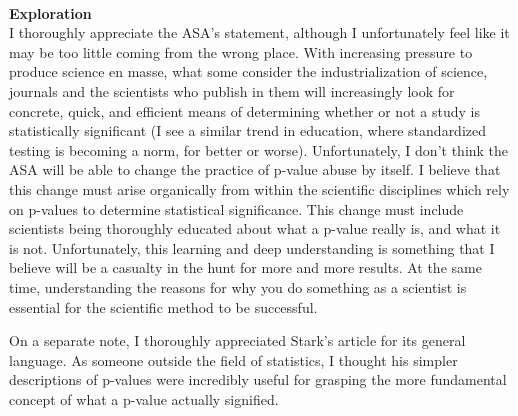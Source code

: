 \documentclass{report}
\newcommand{\tab}{\-\hspace{1cm}}
\begin{document}
\-\\
\textbf{Exploration}\\
\tab I thoroughly appreciate the ASA's statement, although I unfortunately feel like it may be too little coming from the wrong place. With increasing pressure to produce science en masse, what some consider the industrialization of science, journals and the scientists who publish in them will increasingly look for concrete, quick, and efficient means of determining whether or not a study is statistically significant (I see a similar trend in education, where standardized testing is becoming a norm, for better or worse). Unfortunately, I don't think the ASA will be able to change the practice of p-value abuse by itself. I believe that this change must arise organically from within the scientific disciplines which rely on p-values to determine statistical significance. This change must include scientists being thoroughly educated about what a p-value really is, and what it is not. Unfortunately, this learning and deep understanding is something that I believe will be a casualty in the hunt for more and more results. At the same time, understanding the reasons for why you do something as a scientist is essential for the scientific method to be successful.

\tab On a separate note, I thoroughly appreciated Stark's article for its general language. As someone outside the field of statistics, I thought his simpler descriptions of p-values were incredibly useful for grasping the more fundamental concept of what a p-value actually signified.  \\
\end{document}
